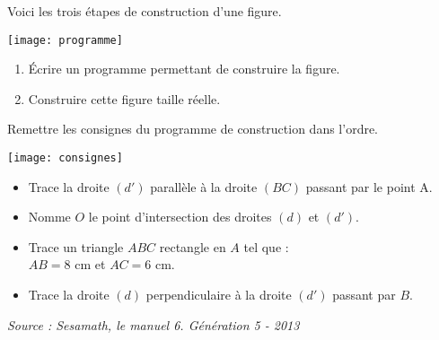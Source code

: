 \begin{colonne*exercice}
\medskip

\begin{exercice}
   Voici les trois étapes de construction d'une figure.
   \begin{center}
      \texttt{[image: programme]}
   \end{center}
   \vspace*{-6mm}
   \begin{enumerate}
      \item Écrire un programme permettant de construire la figure.
      \item Construire cette figure taille réelle.
   \end{enumerate}
\end{exercice}

\begin{exercice}
   Remettre les consignes du programme de construction dans l'ordre.
   \begin{center}
      \texttt{[image: consignes]}
   \end{center}
   \vspace*{-5mm}
   \begin{itemize}
      \item Trace la droite $(d')$ parallèle à la droite $(BC)$ passant par le point A.
      \item Nomme $O$ le point d'intersection des droites $(d)$ et $(d')$.
      \item Trace un triangle $ABC$ rectangle en $A$ tel que : \\
       $AB = 8$ cm et $AC = 6$ cm.
      \item Trace la droite $(d)$ perpendiculaire à la droite $(d')$ passant par $B$.
   \end{itemize}
\end{exercice}

\hfill {\it\footnotesize Source : Sesamath, le manuel 6. Génération 5 - 2013}

\end{colonne*exercice}


\Recreation

     
